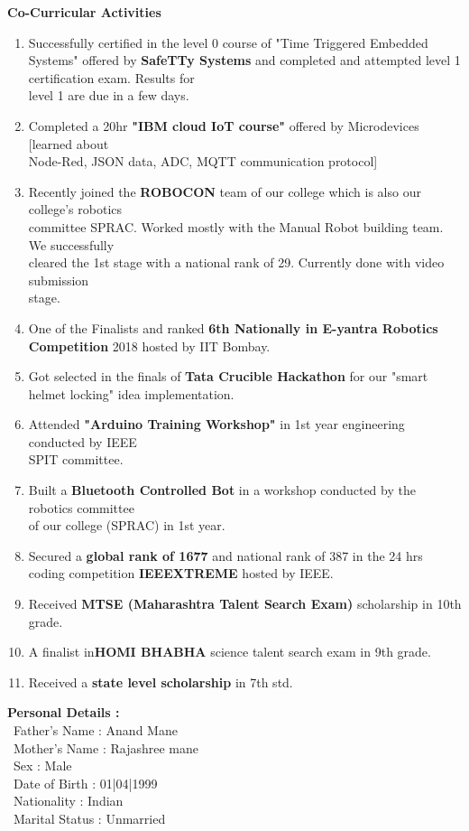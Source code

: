 \documentclass[12pt]{article}
\begin{document}
\begin{flushleft}
\vspace{10mm}
\textbf{Co-Curricular Activities}
\begin{enumerate}
	\item Successfully certified in the level 0 course of "Time Triggered Embedded Systems" offered by \textbf{SafeTTy Systems} and completed and attempted level 1 certification exam. Results for\\ level 1 are due in a few days.  
	\item Completed a 20hr \textbf{"IBM cloud IoT course"} offered by Microdevices [learned about \\Node-Red, JSON data, ADC, MQTT communication protocol]
	\item Recently joined the \textbf{ROBOCON} team of our college which is also our college's robotics \\committee SPRAC. Worked mostly with the Manual Robot building team. We successfully\\ cleared the 1st stage with a national rank of 29. Currently done with video submission \\stage.
	\item One of the Finalists and ranked \textbf{6th Nationally in E-yantra Robotics Competition} 2018 hosted by IIT Bombay.  
	\item Got selected in the finals of \textbf{Tata Crucible Hackathon} for our "smart helmet locking" idea implementation.
	\item Attended \textbf{"Arduino Training Workshop"} in 1st year engineering conducted by IEEE \\SPIT committee.
	\item Built a \textbf{Bluetooth Controlled Bot} in a workshop conducted by the robotics committee \\of our college (SPRAC) in 1st year.
	\item Secured a \textbf{global rank of 1677} and national rank of 387 in the 24 hrs coding competition \textbf{IEEEXTREME} hosted by IEEE.
	\item Received \textbf{MTSE (Maharashtra Talent Search Exam)} scholarship in 10th grade.
	\item A finalist in\textbf{HOMI BHABHA} science talent search exam in 9th grade.
	\item Received a \textbf{state level scholarship} in 7th std.
		
\end{enumerate}

\vspace{10mm}
\textbf{Personal Details :}
\vspace{5mm}\\
\ Father's Name : Anand Mane\\
\ Mother's Name : Rajashree mane\\
\ Sex : Male\\
\ Date of Birth : 01|04|1999\\
\ Nationality : Indian\\
\ Marital Status : Unmarried \\


\end{flushleft}
\end{document}
